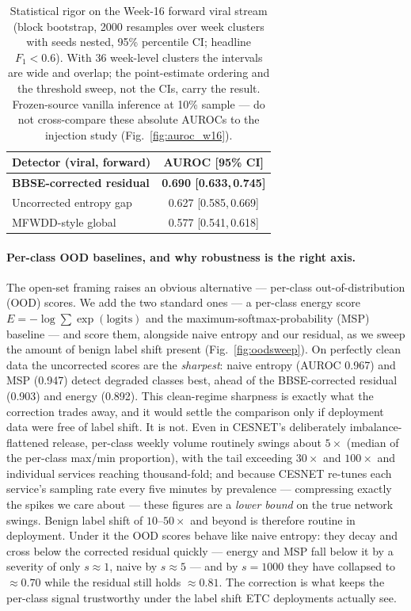 \begin{table}[t]
\caption{Statistical rigor on the Week-16 forward viral stream (block bootstrap,
2000 resamples over week clusters with seeds nested, 95\% percentile CI; headline
$F_1<0.6$). With 36 week-level clusters the intervals are wide and overlap; the
point-estimate ordering and the threshold sweep, not the CIs, carry the result.
Frozen-source vanilla inference at 10\% sample --- do not cross-compare these
absolute AUROCs to the injection study (Fig.~\ref{fig:auroc_w16}).}
\label{tab:statrigor}
\centering\small
\begin{tabular}{lc}
\toprule
Detector (viral, forward) & AUROC [95\% CI] \\
\midrule
\textbf{BBSE-corrected residual} & \textbf{0.690 [0.633,\,0.745]} \\
Uncorrected entropy gap        & 0.627 [0.585,\,0.669] \\
MFWDD-style global             & 0.577 [0.541,\,0.618] \\
\bottomrule
\end{tabular}
\end{table}

\paragraph{Per-class OOD baselines, and why robustness is the right axis.} The
open-set framing raises an obvious alternative --- per-class
out-of-distribution (OOD) scores. We add the two standard ones --- a per-class
energy score $E=-\log\sum\exp(\text{logits})$ \cite{liu2020energy} and the
maximum-softmax-probability (MSP) baseline \cite{hendrycks2017msp} --- and score
them, alongside naive entropy and our residual, as we sweep the
amount of benign label shift present (Fig.~\ref{fig:oodsweep}). On perfectly clean
data the uncorrected scores are the \emph{sharpest}: naive entropy (AUROC 0.967)
and MSP (0.947) detect degraded classes best, ahead of the BBSE-corrected residual
(0.903) and energy (0.892). This clean-regime sharpness is exactly what the
correction trades away, and it would settle the comparison only if deployment data
were free of label shift. It is not. Even in CESNET's deliberately
imbalance-flattened release, per-class weekly volume routinely swings about
$5\times$ (median of the per-class max/min proportion), with the tail exceeding
$30\times$ and $100\times$ and individual services reaching thousand-fold; and
because CESNET re-tunes each service's sampling rate every five minutes by
prevalence --- compressing exactly the spikes we care about --- these figures are a
\emph{lower bound} on the true network swings. Benign label shift of
$10$--$50\times$ and beyond is therefore routine in deployment. Under it the OOD
scores behave like naive entropy: they decay and cross below the corrected residual
quickly --- energy and MSP fall below it by a severity of only $s\!\approx\!1$, naive
by $s\!\approx\!5$ --- and by $s\!=\!1000$ they have collapsed to $\approx0.70$ while
the residual still holds $\approx0.81$. The correction is what keeps the per-class
signal trustworthy under the label shift ETC deployments actually see.

